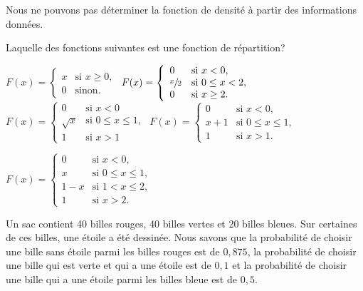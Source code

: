 \begin{questions}
\begin{checkboxes}
      		\vspace{0.3cm}

\choice Nous ne pouvons pas déterminer la fonction de densité à partir des informations données.

\end{checkboxes}

\vspace{0.5cm}
\question[3]\label{normaleBivariee}
Laquelle des fonctions suivantes est une fonction de répartition? 

\begin{checkboxes}
\choice $F(x)=\left\{
			\begin{array}{ll}
			x  & \mbox{si } x \ge 0, \\
			0 & \mbox{sinon.}
			\end{array}
			\right. $
		\vspace{0.3cm}
\choice $ F(x) = \left\{
			\begin{array}{ll}
			0  & \mbox{si } x<0, \\
			\displaystyle \sfrac{x}{2} & \mbox{si } 0\leq x < 2,\\
			0 & \mbox{si } x \geq 2.
			\end{array}
			\right. $
\choice $ F(x) = \left\{
			\begin{array}{ll}
            0 & \mbox{si } x<0\\
			\sqrt{x}  & \mbox{si } 0\leq x\leq 1, \\
			1 & \mbox{si } x>1
			\end{array}
			\right. $
\choice $ F(x) = \left\{
			\begin{array}{ll}
			0  & \mbox{si } x < 0, \\
			x + 1& \mbox{si } 0 \leq x \leq 1,\\
			1 &  \mbox{si } x > 1.
			\end{array}
			\right. $

   \choice $ F(x) = \left\{
			\begin{array}{ll}
			0  & \mbox{si } x < 0, \\
			x & \mbox{si } 0 \leq x \leq 1,\\
                1-x & \mbox{si } 1< x \leq 2,\\ 
			1 &  \mbox{si } x> 2.
			\end{array}
			\right. $
\end{checkboxes}

\pageblanche

\question\label{module1_2} 

Un sac contient 40 billes rouges, 40 billes vertes et 20 billes bleues.
Sur certaines de ces billes, une étoile a été dessinée.
Nous savons que la probabilité de choisir une bille sans étoile parmi les billes rouges est de $0,875$, la probabilité de choisir une bille qui est verte et qui a une étoile est de $0,1$ et la probabilité de choisir une bille qui a une étoile parmi les billes bleue est de $0,5$.


\end{questions}
